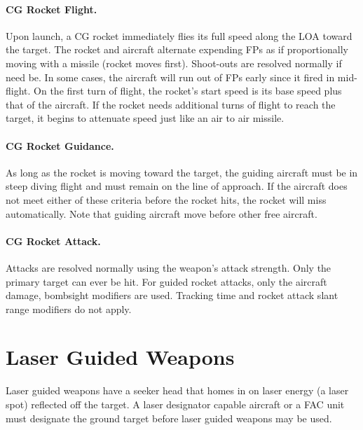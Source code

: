 \paragraph{CG Rocket Flight.} Upon launch, a CG rocket immediately flies its full speed along the LOA toward the target. The rocket and aircraft alternate expending FPs as if proportionally moving with a missile (rocket moves first). Shoot-outs are resolved normally if need be. In some cases, the aircraft will run out of FPs early since it fired in mid-flight. On the first turn of flight, the rocket's start speed is its base speed plus that of the aircraft. If the rocket needs additional turns of flight to reach the target, it begins to attenuate speed just like an air to air missile.

\paragraph{CG Rocket Guidance.} As long as the rocket is moving toward the target, the guiding aircraft must be in steep diving flight and must remain on the line of approach. If the aircraft does not meet either of these criteria before the rocket hits, the rocket will miss automatically. Note that guiding aircraft move before other free aircraft.

\paragraph{CG Rocket Attack.} Attacks are resolved normally using the weapon's attack strength. Only the primary target can ever be hit.  For guided rocket attacks, only the aircraft damage, bombsight modifiers are used. Tracking time and rocket attack slant range modifiers do not apply.

\section{Laser Guided Weapons}
\label{rule:laser-guided-weapons}

Laser guided weapons have a seeker head that homes in on laser energy (a laser spot) reflected off the target. A laser designator capable aircraft or a FAC unit must designate the ground target before laser guided weapons may be used.

